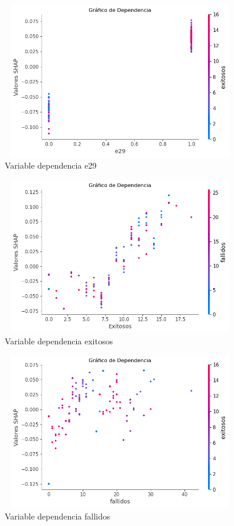 \begin{figure}[H]
    \centering
    \includegraphics[width=4.0611in,height=2.6861in]{img/shap_rf/e29.png}
    \caption{Variable dependencia e29}
    \label{fig:dependencia_e29}
\end{figure}

\begin{figure}[H]
    \centering
    \includegraphics[width=4.0611in,height=2.6861in]{img/shap_rf/exitosos.png}
    \caption{Variable dependencia exitosos}
    \label{fig:dependencia_exitosos}
\end{figure}

\begin{figure}[H]
    \centering
    \includegraphics[width=4.0611in,height=2.6861in]{img/shap_rf/fallidos.png}
    \caption{Variable dependencia fallidos}
    \label{fig:dependencia_fallidos}
\end{figure}